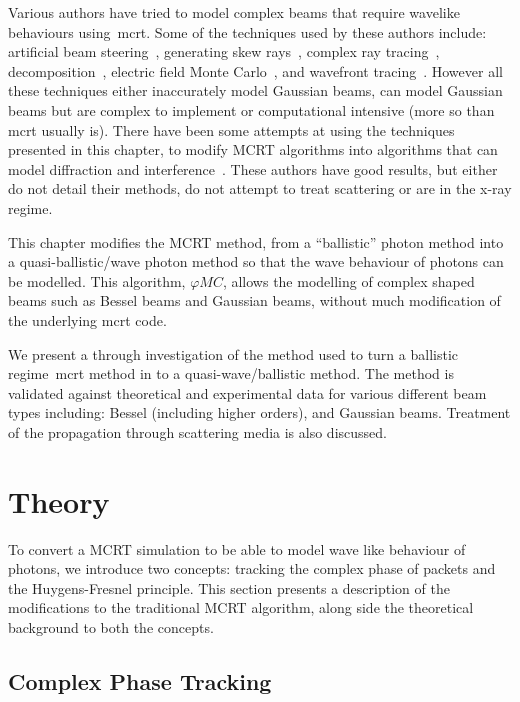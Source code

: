 Various authors have tried to model complex beams that require wavelike behaviours using~\gls*{mcrt}.
Some of the techniques used by these authors include: artificial beam steering~\cite{hokr2015modeling}, generating skew rays~\cite{arnaud1985representation}, complex ray tracing~\cite{harvey2015modeling}, decomposition~\cite{worku2018decomposition}, electric field Monte Carlo~\cite{cai2014electric}, and wavefront tracing~\cite{volpe2017huygens}.
However all these techniques either inaccurately model Gaussian beams, can model Gaussian beams but are complex to implement or computational intensive (more so than \gls*{mcrt} usually is).
There have been some attempts at using the techniques presented in this chapter, to modify MCRT algorithms into algorithms that can model diffraction and interference~\cite{mignon2016fractional,peter2014combining,mahan2018monte,mout2016simulating,fischer2008monte}.
These authors have good results, but either do not detail their methods, do not attempt to treat scattering or are in the x-ray regime.


This chapter modifies the MCRT method, from a ``ballistic'' photon method into a quasi-ballistic/wave photon method so that the wave behaviour of photons can be modelled.
This algorithm, $\varphi MC$, allows the modelling of complex shaped beams such as Bessel beams and Gaussian beams, without much modification of the underlying \gls*{mcrt} code.

We present a through investigation of the method used to turn a ballistic regime~\gls*{mcrt} method in to a quasi-wave/ballistic method.
The method is validated against theoretical and experimental data for various different beam types including: Bessel (including higher orders), and Gaussian beams.
Treatment of the propagation through scattering media is also discussed.


\section{Theory}\label{sec:bestheory}

To convert a MCRT simulation to be able to model wave like behaviour of photons, we introduce two concepts: tracking the complex phase of packets and the Huygens-Fresnel principle.
This section presents a description of the modifications to the traditional MCRT algorithm, along side the theoretical background to both the concepts.

\subsection{Complex Phase Tracking}


